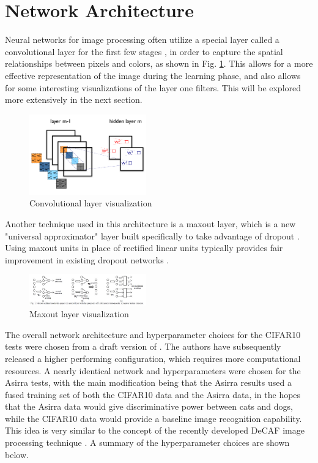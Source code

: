 \documentclass[journal]{IEEEtran}
\begin{document}
\section{Network Architecture}
Neural networks for image processing often utilize a special layer called a
convolutional layer for the first few stages \cite{Convolutional}, in order 
to capture the spatial relationships between pixels and colors, as shown in 
Fig. \ref{fig:convolutional}. This allows for a more effective representation
of the image during the learning phase, and also allows for some interesting
visualizations of the layer one filters. This will be explored more extensively
in the next section.

\begin{figure}[h!]
\centering
  \includegraphics[width=0.45\textwidth]{convolutional.png}
  \caption{Convolutional layer visualization \cite{LeNetTut}}
\label{fig:convolutional}
\end{figure}

Another technique used in this architecture is a maxout layer, which is a new
"universal approximator" layer built specifically to take advantage of dropout
\cite{Dropout}. Using maxout units in place of rectified linear units typically
provides fair improvement in existing dropout networks \cite{Maxout}. 

\begin{figure}[h!]
\centering
  \includegraphics[width=0.45\textwidth]{maxout.png}
  \caption{Maxout layer visualization \cite{Lowresource}}
\label{fig:maxout}
\end{figure}

The overall network architecture and hyperparameter choices for the CIFAR10 
tests were chosen from a draft version of \cite{Maxout}. The authors have 
subsequently released a higher performing configuration, which requires more
computational resources. A nearly identical network and hyperparameters were 
chosen for the Asirra tests, with the main modification being that the Asirra
results used a fused training set of both the CIFAR10 data and the Asirra data,
in the hopes that the Asirra data would give discriminative power between cats
and dogs, while the CIFAR10 data would provide a baseline image recognition 
capability. This idea is very similar to the concept of the recently developed
DeCAF image processing technique \cite{DeCAF}. A summary of the hyperparameter
choices are shown below.
\end{document}
